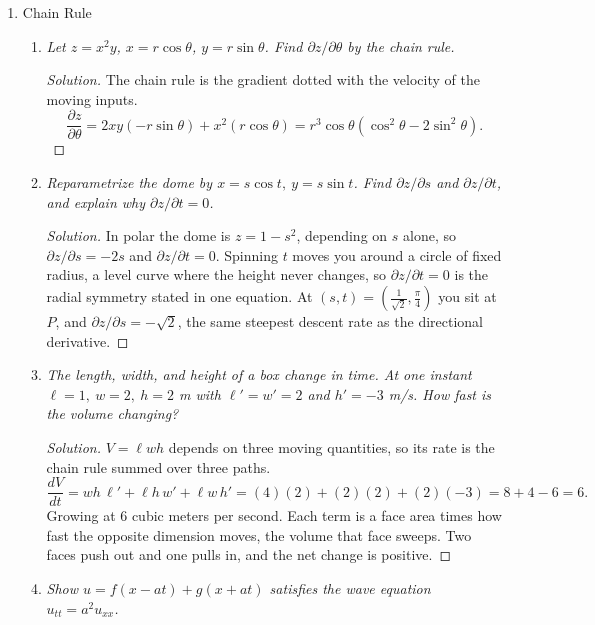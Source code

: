 \documentclass[12pt]{article}
\newenvironment{solution}
  {\renewcommand\qedsymbol{$\blacksquare$}\begin{proof}[Solution]}
  {\end{proof}}
\begin{document}
\begin{enumerate}
\begin{enumerate}
    \end{enumerate}
\newpage

\item Chain Rule

    \begin{enumerate}
    \item \textit{Let $z=x^2y$, $x=r\cos\theta$, $y=r\sin\theta$. Find $\partial z/\partial\theta$ by the chain rule.}

    \begin{solution}
    The chain rule is the gradient dotted with the velocity of the moving inputs.
    \[
      \frac{\partial z}{\partial\theta}=2xy(-r\sin\theta)+x^2(r\cos\theta)=r^3\cos\theta(\cos^2\theta-2\sin^2\theta).
    \]
    \end{solution}

    \item \textit{Reparametrize the dome by $x=s\cos t,\ y=s\sin t$. Find $\partial z/\partial s$ and $\partial z/\partial t$, and explain why $\partial z/\partial t=0$.}

    \begin{solution}
    In polar the dome is $z=1-s^2$, depending on $s$ alone, so $\partial z/\partial s=-2s$ and $\partial z/\partial t=0$. Spinning $t$ moves you around a circle of fixed radius, a level curve where the height never changes, so $\partial z/\partial t=0$ is the radial symmetry stated in one equation. At $(s,t)=(\tfrac{1}{\sqrt2},\tfrac{\pi}{4})$ you sit at $P$, and $\partial z/\partial s=-\sqrt2$, the same steepest descent rate as the directional derivative.
    \end{solution}

    \item \textit{The length, width, and height of a box change in time. At one instant $\ell=1,\ w=2,\ h=2$ m with $\ell'=w'=2$ and $h'=-3$ m/s. How fast is the volume changing?}

    \begin{solution}
    $V=\ell wh$ depends on three moving quantities, so its rate is the chain rule summed over three paths.
    \[
      \frac{dV}{dt}=wh\,\ell'+\ell h\,w'+\ell w\,h'=(4)(2)+(2)(2)+(2)(-3)=8+4-6=6.
    \]
    Growing at $6$ cubic meters per second. Each term is a face area times how fast the opposite dimension moves, the volume that face sweeps. Two faces push out and one pulls in, and the net change is positive.
    \end{solution}

    \item \textit{Show $u=f(x-at)+g(x+at)$ satisfies the wave equation $u_{tt}=a^2u_{xx}$.}


\end{enumerate}
\end{enumerate}
\end{document}
